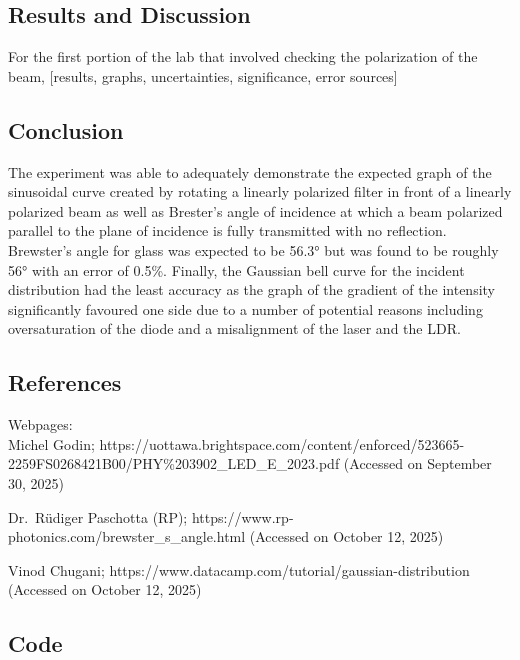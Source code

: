 \documentclass[11pt]{article}
\makeatletter
\newcommand{\boxspacing}{\kern\kvtcb@left@rule\kern\kvtcb@boxsep}
\newcommand{\prompt}[4]{
        {\ttfamily\llap{{\color{#2}[#3]:\hspace{3pt}#4}}\vspace{-\baselineskip}}
    }
\makeatother
\begin{document}
    \begin{tcolorbox}[breakable, size=fbox, boxrule=1pt, pad at break*=1mm,colback=cellbackground, colframe=cellborder]
\prompt{In}{incolor}{ }{\boxspacing}
\begin{Verbatim}[commandchars=\\\{\}]

\end{Verbatim}
\end{tcolorbox}

    \hypertarget{results-and-discussion}{%
\subsection{Results and Discussion}\label{results-and-discussion}}

    For the first portion of the lab that involved checking the polarization
of the beam, {[}results, graphs, uncertainties, significance, error
sources{]}

    \hypertarget{conclusion}{%
\subsection{Conclusion}\label{conclusion}}

    The experiment was able to adequately demonstrate the expected graph of
the sinusoidal curve created by rotating a linearly polarized filter in
front of a linearly polarized beam as well as Brester's angle of
incidence at which a beam polarized parallel to the plane of incidence
is fully transmitted with no reflection. Brewster's angle for glass was
expected to be 56.3° but was found to be roughly 56° with an error of
0.5\%. Finally, the Gaussian bell curve for the incident distribution
had the least accuracy as the graph of the gradient of the intensity
significantly favoured one side due to a number of potential reasons
including oversaturation of the diode and a misalignment of the laser
and the LDR.

    \hypertarget{references}{%
\subsection{References}\label{references}}

    Webpages: \\
Michel Godin;
https://uottawa.brightspace.com/content/enforced/523665-2259FS0268421B00/PHY\%203902\_LED\_E\_2023.pdf
(Accessed on September 30, 2025)

Dr.~Rüdiger Paschotta (RP);
https://www.rp-photonics.com/brewster\_s\_angle.html (Accessed on
October 12, 2025)

Vinod Chugani; https://www.datacamp.com/tutorial/gaussian-distribution
(Accessed on October 12, 2025)

    \hypertarget{code}{%
\subsection{Code}\label{code}}


    
    
    
\end{document}
